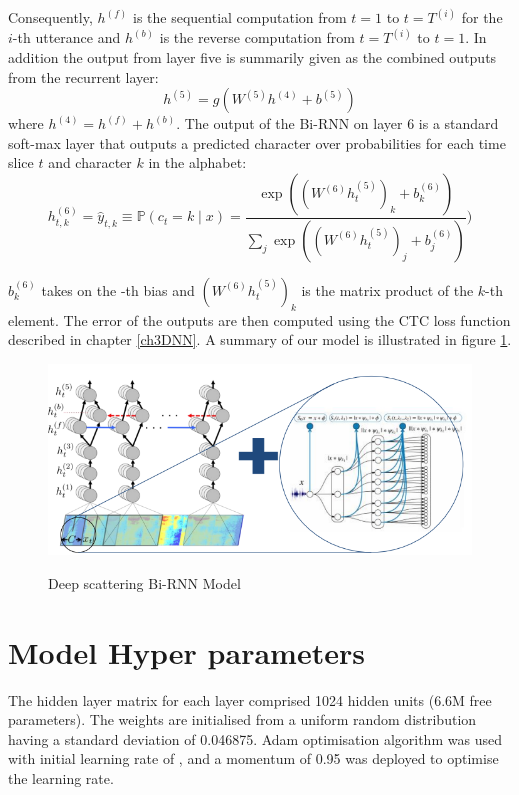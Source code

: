 Consequently, $h^{(f)}$ is the sequential computation from $t=1$ to $t=T^{(i)}$ for the $i$-th utterance and $h^{(b)}$ is the reverse computation from $t=T^{(i)}$ to $t=1$.  In addition the output from layer five is summarily given as the combined outputs from the recurrent layer:
\begin{equation}
h^{(5)} = g(W^{(5)} h^{(4)} + b^{(5)})    \label{ch06_04_l5}
\end{equation}
where $h^{(4)} = h^{(f)} + h^{(b)}$. The output of the Bi-RNN on layer 6 is a standard soft-max layer that outputs a predicted character over probabilities for each time slice $t$ and character $k$ in the alphabet:
\begin{equation}
h^{(6)}_{t,k} = \hat{y}_{t,k} \equiv \mathbb{P}(c_t = k \mid x) = \frac{\exp{ \left( (W^{(6)} h^{(5)}_t)_k + b^{(6)}_k \right)}}{\sum_j \exp{\left( (W^{(6)} h^{(5)}_t)_j + b^{(6)}_j \right)}})    \label{ch06_05_l6}
\end{equation}

$b^{(6)}_k$ takes on the -th bias and $(W^{(6)} h^{(5)}_t)_k$ is the matrix product of the $k$-th element.  The error of the outputs are then computed using the CTC loss function \cite{graves_2014} described in chapter \ref{ch3DNN}.  A summary of our model is illustrated in figure \ref{fig_6_1_ctc_scatter}.
\begin{figure}
\centering
  \includegraphics[width=14cm]{thesis/images/ctc_scatter.png}\\
  \caption{Deep scattering Bi-RNN Model} \label{fig_6_1_ctc_scatter}
\end{figure}

\section{Model Hyper parameters}
The hidden layer matrix for each layer comprised 1024 hidden units (6.6M free parameters).  The weights are initialised from a uniform random distribution having a standard deviation of 0.046875.  Adam optimisation algorithm \citep{kingma2014adam} was used with initial learning rate of , and a momentum of 0.95 was deployed to optimise the learning rate.

